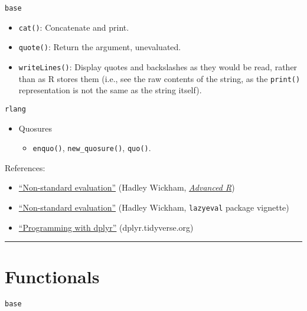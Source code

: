 \documentclass[]{book}
\providecommand{\tightlist}{%
  \setlength{\itemsep}{0pt}\setlength{\parskip}{0pt}}
\theoremstyle{definition}
\theoremstyle{definition}
\theoremstyle{definition}
\theoremstyle{remark}
\begin{document}
\texttt{base}

\begin{itemize}
\tightlist
\item
  \texttt{cat()}: Concatenate and print.
\item
  \texttt{quote()}: Return the argument, unevaluated.
\item
  \texttt{writeLines()}: Display quotes and backslashes as they would be
  read, rather than as R stores them (i.e., see the raw contents of the
  string, as the \texttt{print()} representation is not the same as the
  string itself).
\end{itemize}

\texttt{rlang}

\begin{itemize}
\tightlist
\item
  Quosures

  \begin{itemize}
  \tightlist
  \item
    \texttt{enquo()}, \texttt{new\_quosure()}, \texttt{quo()}.
  \end{itemize}
\end{itemize}

References:

\begin{itemize}
\tightlist
\item
  \href{http://adv-r.had.co.nz/Computing-on-the-language.html}{``Non-standard
  evaluation''} (Hadley Wickham,
  \href{http://adv-r.had.co.nz/}{\emph{Advanced R}})
\item
  \href{https://cran.r-project.org/web/packages/lazyeval/vignettes/lazyeval.html}{``Non-standard
  evaluation''} (Hadley Wickham, \texttt{lazyeval} package vignette)
\item
  \href{https://dplyr.tidyverse.org/articles/programming.html}{``Programming
  with dplyr''} (dplyr.tidyverse.org)
\end{itemize}

\begin{center}\rule{0.5\linewidth}{\linethickness}\end{center}

\section{Functionals}\label{functionals}

\texttt{base}
\end{document}
